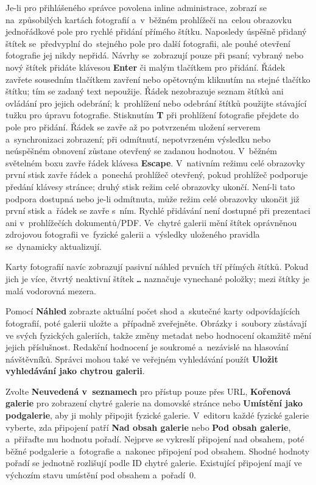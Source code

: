 \documentclass[11pt,a4paper]{article}
\newcommand{\ui}[1]{\textbf{#1}}
\begin{document}
Je-li pro přihlášeného správce povolena inline administrace, zobrazí se
na~způsobilých
kartách fotografií a~v~běžném prohlížeči na~celou obrazovku jednořádkové pole
pro rychlé
přidání přímého štítku. Naposledy úspěšně přidaný štítek se~předvyplní
do~stejného pole
pro další fotografii, ale pouhé otevření fotografie jej nikdy nepřidá. Návrhy
se~zobrazují
pouze při psaní; vybraný nebo nový štítek přidáte klávesou \ui{Enter} či malým
tlačítkem
pro přidání. Řádek zavřete sousedním tlačítkem zavření nebo opětovným kliknutím
na stejné
tlačítko štítku; tím se zadaný text nepoužije. Řádek nezobrazuje seznam štítků
ani ovládání pro jejich odebrání; k~prohlížení
nebo odebrání štítků použijte stávající tužku pro úpravu fotografie. Stisknutím
\ui{T}
při prohlížení fotografie přejdete do pole pro přidání. Řádek se zavře až po
potvrzeném
uložení serverem a~synchronizaci zobrazení; při odmítnutí,
nepotvrzeném výsledku nebo neúspěšném obnovení zůstane otevřený se zadanou
hodnotou.
V~běžném světelném boxu zavře řádek klávesa \ui{Escape}. V~nativním režimu celé
obrazovky
první stisk zavře řádek a~ponechá prohlížeč otevřený, pokud prohlížeč podporuje
předání
klávesy stránce; druhý stisk režim celé obrazovky ukončí. Není-li tato podpora
dostupná
nebo je-li odmítnuta, může režim celé obrazovky ukončit již první stisk a~řádek
se zavře s~ním.
Rychlé přidávání není dostupné při
prezentaci ani v~prohlížečích dokumentů/PDF. Ve~chytré galerii mění štítek
oprávněnou
zdrojovou fotografii ve~fyzické galerii a~výsledky uloženého pravidla
se~dynamicky
aktualizují.

Karty fotografií navíc zobrazují pasivní náhled prvních tří přímých štítků.
Pokud jich je více, čtvrtý neaktivní štítek \texttt{…} naznačuje vynechané
položky;
mezi štítky je malá vodorovná mezera.

Pomocí \ui{Náhled} zobrazte aktuální počet shod a~skutečné karty odpovídajících
fotografií, poté galerii uložte a~případně zveřejněte. Obrázky i~soubory
zůstávají ve svých fyzických galeriích, takže změny metadat nebo hodnocení
okamžitě mění jejich příslušnost. Redakční hodnocení je soukromé a~nezávislé na
hlasování návštěvníků. Správci mohou také ve veřejném vyhledávání použít
\ui{Uložit vyhledávání jako chytrou galerii}.

Zvolte \ui{Neuvedená v~seznamech} pro přístup pouze přes URL, \ui{Kořenová
galerie} pro zobrazení chytré galerie na domovské stránce nebo \ui{Umístění jako
podgalerie}, aby ji mohly připojit fyzické galerie. V~editoru každé fyzické
galerie vyberte, zda připojení patří \ui{Nad obsah galerie} nebo \ui{Pod obsah
galerie}, a~přiřaďte mu hodnotu pořadí. Nejprve se vykreslí připojení nad
obsahem, poté běžné podgalerie a~fotografie a~nakonec připojení pod obsahem.
Shodné hodnoty pořadí se jednotně rozlišují podle ID chytré galerie. Existující
připojení mají ve výchozím stavu umístění pod obsahem a~pořadí~0.
\end{document}
